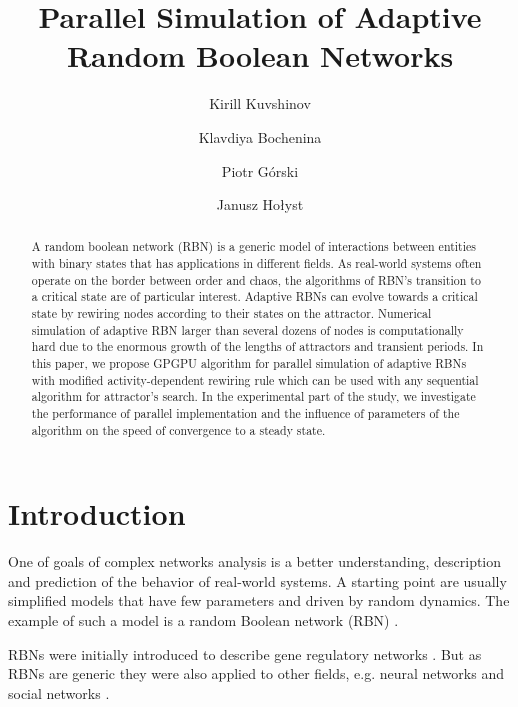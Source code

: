\documentclass[procedia]{easychair}
\title{Parallel Simulation of Adaptive Random Boolean Networks}
\author{
	Kirill Kuvshinov\inst{1}
	\and
	Klavdiya Bochenina\inst{1}
	\and
	Piotr G{\'{o}}rski\inst{2}
	\and
	Janusz Ho{\l}yst\inst{1}\inst{2}
}
\institute{
	ITMO University, St. Petersburg, Russian Federation
	\and
	Warsaw University of Technology, Warsaw, Poland
}
\begin{document}
	
	\maketitle
	
	
	\begin{abstract}
		A random boolean network (RBN) is a generic model of interactions between entities with binary states that has applications in different fields. As real-world systems often operate on the border between order and chaos, the algorithms of RBN's transition to a critical state are of particular interest. Adaptive RBNs can evolve towards a critical state by rewiring nodes according to their states on the attractor. Numerical simulation of adaptive RBN larger than several dozens of nodes is computationally hard due to the enormous growth of the lengths of attractors and transient periods. In this paper, we propose GPGPU algorithm for parallel simulation of adaptive RBNs with modified activity-dependent rewiring rule which can be used with any sequential algorithm for attractor's search. In the experimental part of the study, we investigate the performance of parallel implementation and the influence of parameters of the algorithm on the speed of convergence to a steady state. 
	\end{abstract}
	
	
	\section{Introduction}
	\label{sect:introduction}
	
	One of goals of complex networks analysis is a better understanding, description and prediction of the behavior of real-world systems. A starting point are usually simplified models that have few parameters and driven by random dynamics. The example of such a model is a random Boolean network (RBN) \cite{gershenson04,drossel2008random,cheng2011random,aldana2003boolean}. 
	
	RBNs were initially introduced to describe gene regulatory networks \cite{kauffman1969metabolic,kauffman2004ensemble}. But as RBNs are generic they were also applied to other fields, e.g. neural networks and social networks \cite{drossel2008random}.
	
\end{document}
